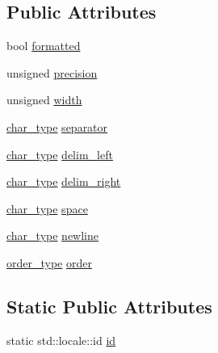 \subsection*{Public Attributes}
\begin{DoxyCompactItemize}
\item 
bool \hyperlink{classglm_1_1io_1_1format__punct_ab28088e6eef03fe4222fa8a5dd95288e}{formatted}
\item 
unsigned \hyperlink{classglm_1_1io_1_1format__punct_a5a15d396b7c963df9dec5e124236dc02}{precision}
\item 
unsigned \hyperlink{classglm_1_1io_1_1format__punct_a95d32ca2330bbf7c50d3e066b7a851db}{width}
\item 
\hyperlink{classglm_1_1io_1_1format__punct_ae94c42484a4c5258ad7b2f0f029efdf3}{char\+\_\+type} \hyperlink{classglm_1_1io_1_1format__punct_ac561eb04fc2a1282ef38ea15f8e640ee}{separator}
\item 
\hyperlink{classglm_1_1io_1_1format__punct_ae94c42484a4c5258ad7b2f0f029efdf3}{char\+\_\+type} \hyperlink{classglm_1_1io_1_1format__punct_ab1beed331269a39b06d17d02cf727d7c}{delim\+\_\+left}
\item 
\hyperlink{classglm_1_1io_1_1format__punct_ae94c42484a4c5258ad7b2f0f029efdf3}{char\+\_\+type} \hyperlink{classglm_1_1io_1_1format__punct_a62fb1280404360463ec5af7144aa0949}{delim\+\_\+right}
\item 
\hyperlink{classglm_1_1io_1_1format__punct_ae94c42484a4c5258ad7b2f0f029efdf3}{char\+\_\+type} \hyperlink{classglm_1_1io_1_1format__punct_adf9a915938727793de1daca07dcdfa4e}{space}
\item 
\hyperlink{classglm_1_1io_1_1format__punct_ae94c42484a4c5258ad7b2f0f029efdf3}{char\+\_\+type} \hyperlink{classglm_1_1io_1_1format__punct_a8ddf8abdb0ebbdbb7eca08d7a777956e}{newline}
\item 
\hyperlink{namespaceglm_1_1io_a3497781803fe594a37177e05ab2a795f}{order\+\_\+type} \hyperlink{classglm_1_1io_1_1format__punct_a9de1f3b7120a036ec0ab394d2036d0aa}{order}
\end{DoxyCompactItemize}
\subsection*{Static Public Attributes}
\begin{DoxyCompactItemize}
\item 
static std\+::locale\+::id \hyperlink{classglm_1_1io_1_1format__punct_a763f60aeaecec9290917ed1d83b79838}{id}
\end{DoxyCompactItemize}
